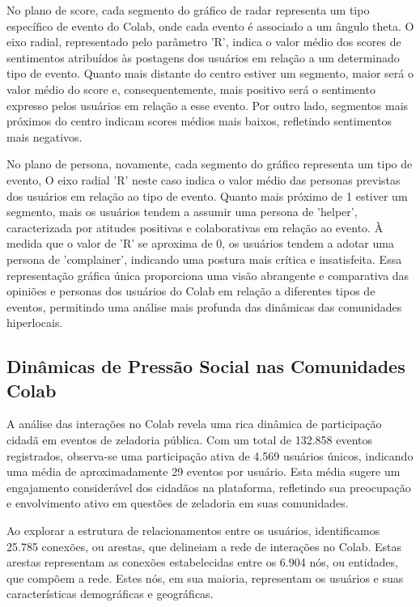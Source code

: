 No plano de score, cada segmento do gráfico de radar representa um tipo específico de evento do Colab, onde cada evento é associado a um ângulo theta. O eixo radial, representado pelo parâmetro 'R', indica o valor médio dos scores de sentimentos atribuídos às postagens dos usuários em relação a um determinado tipo de evento. Quanto mais distante do centro estiver um segmento, maior será o valor médio do score e, consequentemente, mais positivo será o sentimento expresso pelos usuários em relação a esse evento. Por outro lado, segmentos mais próximos do centro indicam scores médios mais baixos, refletindo sentimentos mais negativos.

No plano de persona, novamente, cada segmento do gráfico representa um tipo de evento, O eixo radial 'R' neste caso indica o valor médio das personas previstas dos usuários em relação ao tipo de evento. Quanto mais próximo de 1 estiver um segmento, mais os usuários tendem a assumir uma persona de 'helper', caracterizada por atitudes positivas e colaborativas em relação ao evento. À medida que o valor de 'R' se aproxima de 0, os usuários tendem a adotar uma persona de 'complainer', indicando uma postura mais crítica e insatisfeita. Essa representação gráfica única proporciona uma visão abrangente e comparativa das opiniões e personas dos usuários do Colab em relação a diferentes tipos de eventos, permitindo uma análise mais profunda das dinâmicas das comunidades hiperlocais.

\subsection{Dinâmicas de Pressão Social nas Comunidades Colab}
A análise das interações no Colab revela uma rica dinâmica de participação cidadã em eventos de zeladoria pública. Com um total de 132.858 eventos registrados, observa-se uma participação ativa de 4.569 usuários únicos, indicando uma média de aproximadamente 29 eventos por usuário. Esta média sugere um engajamento considerável dos cidadãos na plataforma, refletindo sua preocupação e envolvimento ativo em questões de zeladoria em suas comunidades.

Ao explorar a estrutura de relacionamentos entre os usuários, identificamos 25.785 conexões, ou arestas, que delineiam a rede de interações no Colab. Estas arestas representam as conexões estabelecidas entre os 6.904 nós, ou entidades, que compõem a rede. Estes nós, em sua maioria, representam os usuários e suas características demográficas e geográficas.

